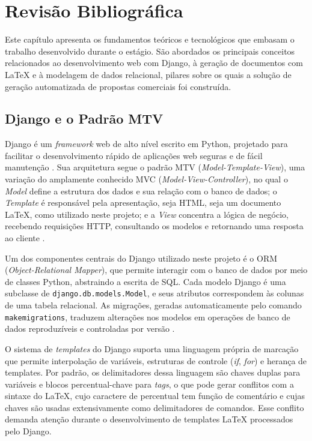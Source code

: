 
\chapter{Revisão Bibliográfica}
\label{ch:revisao-bibliografica}

Este capítulo apresenta os fundamentos teóricos e tecnológicos que embasam o trabalho desenvolvido
durante o estágio. São abordados os principais conceitos relacionados ao desenvolvimento web com Django,
à geração de documentos com LaTeX e à modelagem de dados relacional, pilares sobre os quais a solução
de geração automatizada de propostas comerciais foi construída.

\section{Django e o Padrão MTV}
\label{sec:django}

Django é um \textit{framework} web de alto nível escrito em Python, projetado para facilitar o
desenvolvimento rápido de aplicações web seguras e de fácil manutenção \cite{django2024}. Sua arquitetura
segue o padrão MTV (\textit{Model-Template-View}), uma variação do amplamente conhecido MVC
(\textit{Model-View-Controller}), no qual o \textit{Model} define a estrutura dos dados e sua relação
com o banco de dados; o \textit{Template} é responsável pela apresentação, seja HTML, seja um documento
LaTeX, como utilizado neste projeto; e a \textit{View} concentra a lógica de negócio, recebendo
requisições HTTP, consultando os modelos e retornando uma resposta ao cliente \cite{holovaty2009}.

Um dos componentes centrais do Django utilizado neste projeto é o ORM (\textit{Object-Relational
Mapper}), que permite interagir com o banco de dados por meio de classes Python, abstraindo a escrita
de SQL. Cada modelo Django é uma subclasse de \texttt{django.db.models.Model}, e seus atributos
correspondem às colunas de uma tabela relacional. As migrações, geradas automaticamente pelo comando
\texttt{makemigrations}, traduzem alterações nos modelos em operações de banco de dados reproduzíveis e
controladas por versão \cite{django2024}.

O sistema de \textit{templates} do Django suporta uma linguagem própria de marcação que permite
interpolação de variáveis, estruturas de controle (\textit{if}, \textit{for}) e herança de templates.
Por padrão, os delimitadores dessa linguagem são chaves duplas para variáveis e blocos
percentual-chave para \textit{tags}, o que pode gerar conflitos com a sintaxe do LaTeX, cujo
caractere de percentual tem função de comentário e cujas chaves são usadas extensivamente como
delimitadores de comandos. Esse conflito demanda atenção durante o desenvolvimento de templates LaTeX
processados pelo Django.

